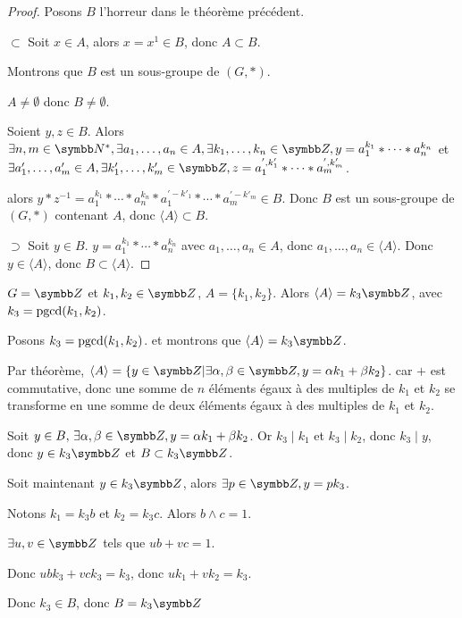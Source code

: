 \begin{proof}
    Posons $B$ l'horreur dans le théorème précédent. 

    $\subset$ Soit $x \in A$, alors $x = x^1 \in B$, donc $A \subset B$.

    Montrons que $B$ est un sous-groupe de $(G, \ast)$.

    $A \neq \emptyset$ donc $B \neq \emptyset$.

    Soient $y, z \in B$. Alors 
    $\exists n, m \in \N^*, \exists a_1, \ldots, a_n \in A, \exists k_1, \ldots, k_n \in \Z, y = a_1^{k_1} \ast \cdots \ast a_n^{k_n}$
    et $\exists a'_1, \ldots, a'_m \in A, \exists k'_1, \ldots, k'_m \in \Z, z = a_1^{', k'_1} \ast \cdots \ast a_m^{', k'_m}$.

    alors $y \ast z^{-1} = a_1^{k_1} \ast \cdots \ast a_n^{k_n} \ast a_1^{' -k'_1} \ast \cdots \ast a_m^{' -k'_m} \in B$.
    Donc $B$ est un sous-groupe de $(G, \ast)$ contenant $A$, donc $\langle A \rangle \subset B$.

    $\supset$ Soit $y \in B$. 
    $y = a_1^{k_1} \ast \cdots \ast a_n^{k_n}$ avec $a_1, \ldots, a_n \in A$, donc $a_1, \ldots, a_n \in \langle A \rangle$.
    Donc $y \in \langle A \rangle$, donc $B \subset \langle A \rangle$.
\end{proof}

\begin{exemple}
    $G = \Z$ et $k_1, k_2 \in \Z$, $A = \{k_1, k_2\}$. 
    Alors $\langle A \rangle = k_3 \Z$, avec $k_3 = \operatorname{pgcd}(k_1, k_2)$.

    Posons $k_3 = \operatorname{pgcd}(k_1, k_2)$. et montrons que $\langle A \rangle = k_3 \Z$.

    Par théorème, $\langle A \rangle = \{y \in \Z | \exists \alpha, \beta \in \Z, y = \alpha k_1 + \beta k_2\}$.
    car $+$ est commutative, donc une somme de $n$ éléments égaux à des multiples de $k_1$ et $k_2$
    se transforme en une somme de deux éléments égaux à des multiples de $k_1$ et $k_2$.

    Soit $y \in B, \, \exists \alpha, \beta \in \Z, y = \alpha k_1 + \beta k_2$. 
    Or $k_3 \mid k_1$ et $k_3 \mid k_2$, donc $k_3 \mid y$, donc $y \in k_3 \Z$ et 
    $B \subset k_3 \Z$.

    Soit maintenant $y \in k_3 \Z$, alors $\exists p \in \Z, y = p k_3$.

    Notons $k_1 = k_3 b$ et $k_2 = k_3 c$. Alors $b \wedge c = 1$.

    $\exists u, v \in \Z$ tels que $ub + vc = 1$.

    Donc $ubk_3 + vck_3 = k_3$, donc $uk_1 + vk_2 = k_3$.

    Donc $k_3 \in B$, donc $B = k_3 \Z$
\end{exemple}


